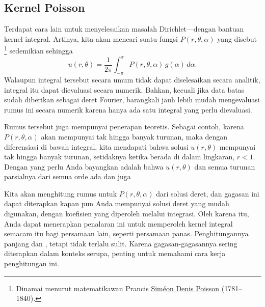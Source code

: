 
\subsection{Kernel Poisson}

Terdapat cara lain untuk menyelesaikan masalah Dirichlet---dengan bantuan
kernel integral.  Artinya, kita akan mencari suatu fungsi $P(r,\theta,\alpha)$
yang disebut \emph{}\footnote{%
Dinamai menurut matematikawan Prancis
\href{https://en.wikipedia.org/wiki/Sim\%C3\%A9on_Denis_Poisson}{Sim\'eon
Denis Poisson}
(1781--1840).} sedemikian sehingga
\begin{equation*}
u(r,\theta) = 
\frac{1}{2\pi}
\int_{-\pi}^{\pi}
P(r,\theta,\alpha) \, g(\alpha) \,d\alpha .
\end{equation*}
Walaupun integral tersebut secara umum tidak dapat diselesaikan secara analitik, integral itu dapat
dievaluasi secara numerik.  Bahkan, kecuali jika data batas sudah diberikan
sebagai deret Fourier, barangkali jauh lebih mudah mengevaluasi
rumus ini secara numerik karena hanya ada satu integral yang perlu dievaluasi.

Rumus tersebut juga mempunyai penerapan teoretis.
Sebagai contoh, karena $P(r,\theta,\alpha)$ 
akan mempunyai tak hingga banyak turunan, maka
dengan diferensiasi di bawah integral, kita mendapati
bahwa solusi $u(r,\theta)$ mempunyai tak hingga banyak turunan, setidaknya
ketika berada di dalam lingkaran, $r < 1$.  Dengan  yang perlu Anda
bayangkan adalah bahwa $u(r,\theta)$  dan semua
turunan parsialnya dari semua orde ada dan juga 


Kita akan menghitung
rumus untuk $P(r,\theta,\alpha)$ dari solusi
deret, dan gagasan ini dapat diterapkan kapan pun Anda mempunyai
solusi deret yang mudah digunakan, dengan koefisien yang diperoleh melalui integrasi.
Oleh karena itu, Anda dapat menerapkan penalaran ini untuk memperoleh kernel integral semacam itu
bagi persamaan lain, seperti persamaan panas.
Penghitungannya panjang dan , tetapi tidak terlalu sulit.
Karena gagasan-gagasannya sering diterapkan dalam konteks serupa, penting untuk
memahami cara kerja penghitungan ini.


